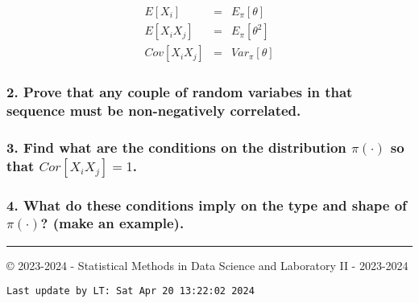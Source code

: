 \documentclass[
]{article}
\begin{document}
\begin{eqnarray*} 
E[X_i]&=&E_{\pi}[\theta]\\
E[X_i X_j] &=& E_{\pi}[\theta^2]\\
Cov[X_i X_j] &=& Var_{\pi}[\theta]
\end{eqnarray*}

\hypertarget{prove-that-any-couple-of-random-variabes-in-that-sequence-must-be-non-negatively-correlated.}{%
\subsubsection{2. Prove that any couple of random variabes in that
sequence must be non-negatively
correlated.}\label{prove-that-any-couple-of-random-variabes-in-that-sequence-must-be-non-negatively-correlated.}}

\hypertarget{find-what-are-the-conditions-on-the-distribution-picdot-so-that-corx_i-x_j1.}{%
\subsubsection{\texorpdfstring{3. Find what are the conditions on the
distribution \(\pi(\cdot)\) so that
\(Cor[X_i X_j]=1\).}{3. Find what are the conditions on the distribution \textbackslash pi(\textbackslash cdot) so that Cor{[}X\_i X\_j{]}=1.}}\label{find-what-are-the-conditions-on-the-distribution-picdot-so-that-corx_i-x_j1.}}

\hypertarget{what-do-these-conditions-imply-on-the-type-and-shape-of-picdot-make-an-example.}{%
\subsubsection{\texorpdfstring{4. What do these conditions imply on the
type and shape of \(\pi(\cdot)\)? (make an
example).}{4. What do these conditions imply on the type and shape of \textbackslash pi(\textbackslash cdot)? (make an example).}}\label{what-do-these-conditions-imply-on-the-type-and-shape-of-picdot-make-an-example.}}

\vspace{10.5cm}

\begin{center}\rule{0.5\linewidth}{0.5pt}\end{center}

© 2023-2024 - Statistical Methods in Data Science and Laboratory II -
2023-2024

\begin{verbatim}
Last update by LT: Sat Apr 20 13:22:02 2024
\end{verbatim}
\end{document}
